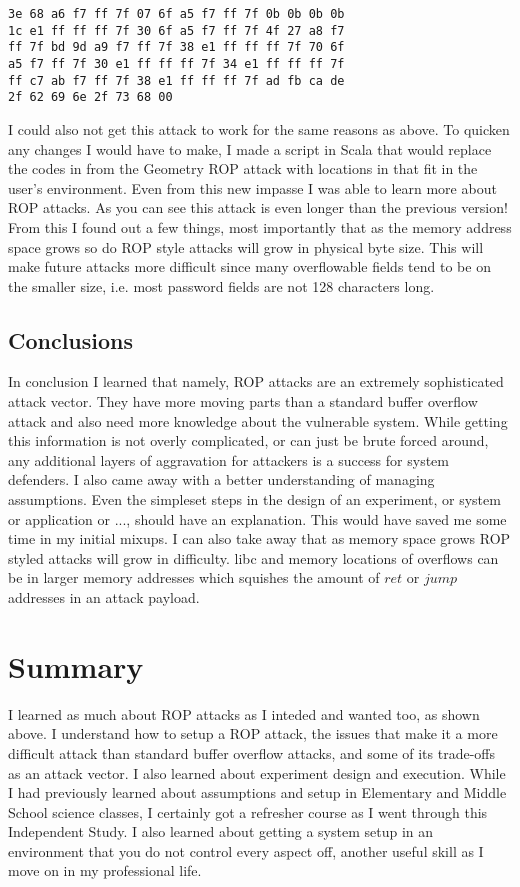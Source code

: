 \documentclass[11pt]{amsart}
\begin{document}
\begin{verbatim}
3e 68 a6 f7 ff 7f 07 6f a5 f7 ff 7f 0b 0b 0b 0b 
1c e1 ff ff ff 7f 30 6f a5 f7 ff 7f 4f 27 a8 f7 
ff 7f bd 9d a9 f7 ff 7f 38 e1 ff ff ff 7f 70 6f 
a5 f7 ff 7f 30 e1 ff ff ff 7f 34 e1 ff ff ff 7f 
ff c7 ab f7 ff 7f 38 e1 ff ff ff 7f ad fb ca de 
2f 62 69 6e 2f 73 68 00
\end{verbatim}
I could also not get this attack to work for the same reasons as above. To quicken any changes I would have to make, I made a script in Scala that would replace the codes in from the Geometry ROP attack with locations in that fit in the user's environment. Even from this new impasse I was able to learn more about ROP attacks.  As you can see this attack is even longer than the previous version!  From this I found out a few things, most importantly that as the memory address space grows so do ROP style attacks will grow in physical byte size.  This will make future attacks more difficult since many overflowable fields tend to be on the smaller size, i.e. most password fields are not 128 characters long.
\subsection*{Conclusions}
In conclusion I learned that namely, ROP attacks are an extremely sophisticated attack vector.  They have more moving parts than a standard buffer overflow attack and also need more knowledge about the vulnerable system.  While getting this information is not overly complicated, or can just be brute forced around, any additional layers of aggravation for attackers is a success for system defenders.  I also came away with a better understanding of managing assumptions.  Even the simpleset steps in the design of an experiment, or system or application or ..., should have an explanation.  This would have saved me some time in my initial mixups.  I can also take away that as memory space grows ROP styled attacks will grow in difficulty.  libc and memory locations of overflows can be in larger memory addresses which squishes the amount of $ret$ or $jump$ addresses in an attack payload.
\section*{Summary}
I learned as much about ROP attacks as I inteded and wanted too, as shown above.  I understand how to setup a ROP attack, the issues that make it a more difficult attack than standard buffer overflow attacks, and some of its trade-offs as an attack vector.  I also learned about experiment design and execution. While I had previously learned about assumptions and setup in Elementary and Middle School science classes, I certainly got a refresher course as I went through this Independent Study. I also learned about getting a system setup in an environment that you do not control every aspect off, another useful skill as I move on in my professional life.
\end{document}
